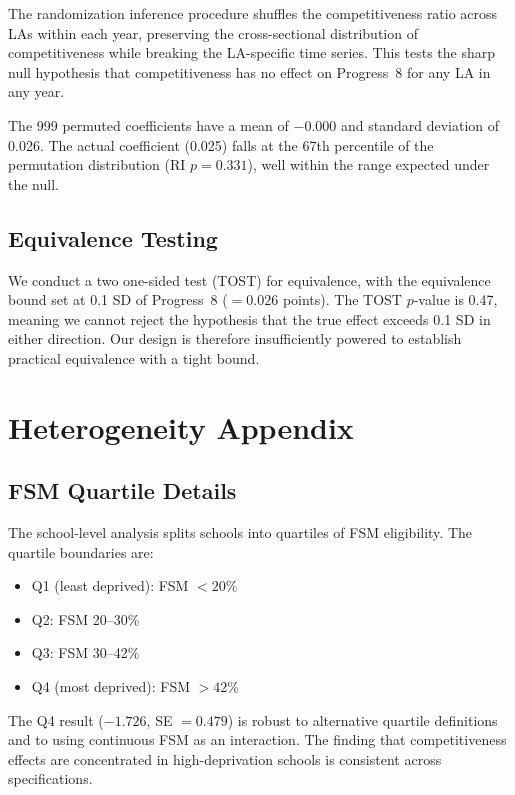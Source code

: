 \documentclass[12pt]{article}
\begin{document}
The randomization inference procedure shuffles the competitiveness ratio across LAs within each year, preserving the cross-sectional distribution of competitiveness while breaking the LA-specific time series. This tests the sharp null hypothesis that competitiveness has no effect on Progress~8 for any LA in any year.

The 999 permuted coefficients have a mean of $-0.000$ and standard deviation of 0.026. The actual coefficient (0.025) falls at the 67th percentile of the permutation distribution (RI $p = 0.331$), well within the range expected under the null.

\subsection{Equivalence Testing}

We conduct a two one-sided test (TOST) for equivalence, with the equivalence bound set at 0.1 SD of Progress~8 ($= 0.026$ points). The TOST $p$-value is 0.47, meaning we cannot reject the hypothesis that the true effect exceeds 0.1 SD in either direction. Our design is therefore insufficiently powered to establish practical equivalence with a tight bound.


\section{Heterogeneity Appendix}
\label{app:het}

\subsection{FSM Quartile Details}

The school-level analysis splits schools into quartiles of FSM eligibility. The quartile boundaries are:
\begin{itemize}
\item Q1 (least deprived): FSM $< 20\%$
\item Q2: FSM 20--30\%
\item Q3: FSM 30--42\%
\item Q4 (most deprived): FSM $> 42\%$
\end{itemize}

The Q4 result ($-1.726$, SE $= 0.479$) is robust to alternative quartile definitions and to using continuous FSM as an interaction. The finding that competitiveness effects are concentrated in high-deprivation schools is consistent across specifications.
\end{document}
